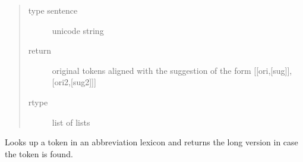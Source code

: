 \documentclass[letterpaper,10pt,english]{sphinxmanual}
\begin{document}
\begin{fulllineitems}
\begin{fulllineitems}
\begin{description}
\begin{quote}
\begin{description}
\item[{type sentence}] \leavevmode
unicode string

\item[{return}] \leavevmode
original tokens aligned with the suggestion of the form {[}{[}ori,{[}sug{]}{]},{[}ori2,{[}sug2{]}{]}{]}

\item[{rtype}] \leavevmode
list of lists

\end{description}\end{quote}

\end{description}

Looks up a token in an abbreviation lexicon and returns the long version in case the token is found.

\end{fulllineitems}


\end{fulllineitems}

\label{API:module-norm.modules.compound}
\end{document}
